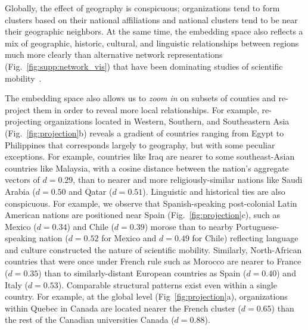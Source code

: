 \documentclass[12pt]{article} %
\begin{document}
Globally, the effect of geography is conspicuous; organizations tend to form clusters based on their national affiliations and national clusters tend to be near their geographic neighbors. 
At the same time, the embedding space also reflects a mix of geographic, historic, cultural, and linguistic relationships between regions much more clearly than alternative network representations (Fig.~\ref{fig:supp:network_vis}) that have been dominating studies of scientific mobility~\autocite{chinchilla2018global, czaika2018globalisation}.

The embedding space also allows us to \textit{zoom in} on subsets of counties and re-project them in order to reveal more local relationships. 
For example, re-projecting organizations located in Western, Southern, and Southeastern Asia (Fig.~\ref{fig:projection}b) reveals a gradient of countries ranging from Egypt to Philippines that corresponds largely to geography, but with some peculiar exceptions. 
For example, countries like Iraq are nearer to some southeast-Asian countries like Malaysia, with a cosine distance between the nation's aggregate vectors of $d = 0.29$, than to nearer and more religiously-similar nations like Saudi Arabia ($d = 0.50$ and Qatar ($d = 0.51$). 
Linguistic and historical ties are also conspicuous.
For example, we observe that Spanish-speaking post-colonial Latin American nations are positioned near Spain (Fig.~\ref{fig:projection}c), such as Mexico ($d = 0.34$) and Chile ($d = 0.39$) morose than to nearby Portuguese-speaking nation ($d = 0.52$ for Mexico and $d = 0.49$ for Chile) reflecting language and culture constructed the nature of scientific mobility.
Similarly, North-African countries that were once under French rule such as Morocco are nearer to France ($d =0.35$) than to similarly-distant European countries as Spain ($d = 0.40$) and Italy ($d = 0.53$). 
Comparable structural patterns exist even within a single country.
For example, at the global level (Fig~\ref{fig:projection}a), organizations within Quebec in Canada are located nearer the French cluster ($d = 0.65$) than the rest of the Canadian universities Canada ($d = 0.88$).
\end{document}

